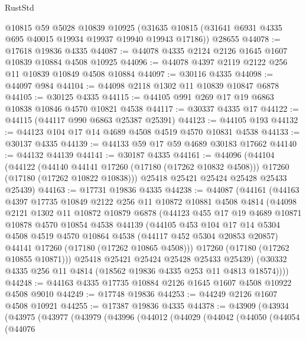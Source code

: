 \begin{lexlean}{RustStd}
\begin{coremodule}
    @10815
    @59
    @5028
    @10839
    @10925
    (@31635 @10815 (@31641 @6931 @4335 @695 @40015 @19934 @19937 @19940 @19943 @17186))
    @28655
@44078 := @17618 @19836 @4335
@44087 := @44078 @4335 @2124 @2126 @1645 @1607 @10839 @10884 @4508 @10925
@44096 := @44078 @4397 @2119 @2122 @256 @11 @10839 @10849 @4508 @10884
@44097 := @30116 @4335
@44098 := @44097 @984
@44104 := @44098 @2118 @1302 @11 @10839 @10847 @6878
@44105 := @30125 @4335
@44115 := @44105 @991 @269 @17 @19 @6863 @10838 @10846 @4570 @10821 @4538
@44117 := @30337 @4335 @17
@44122 := @44115 (@44117 @990 @6863 @25387 @25391)
@44123 := @44105 @193
@44132 := @44123 @104 @17 @14 @4689 @4508 @4519 @4570 @10831 @4538
@44133 := @30137 @4335
@44139 := @44133 @59 @17 @59 @4689 @30183 @17662
@44140 := @44132 @44139
@44141 := @30187 @4335
@44161 := @44096
    (@44104
      (@44122
        (@44140 @44141 @17260 (@17180 (@17262 @10832 @4508)))
        @17260
        (@17180 (@17262 @10822 @10838)))
      @25418
      @25421
      @25424
      @25428
      @25433
      @25439)
@44163 := @17731 @19836 @4335
@44238 := @44087
    (@44161
      (@44163
        @4397
        @17735
        @10849
        @2122
        @256
        @11
        @10872
        @10881
        @4508
        @4814
        (@44098
          @2121
          @1302
          @11
          @10872
          @10879
          @6878
          (@44123
            @455
            @17
            @19
            @4689
            @10871
            @10878
            @4570
            @10854
            @4538
            @44139
            (@44105
              @453
              @104
              @17
              @14
              @5304
              @4508
              @4519
              @4570
              @10864
              @4538
              (@44117 @452 @5304 @20853 @20857)
              @44141
              @17260
              (@17180 (@17262 @10865 @4508)))
            @17260
            (@17180 (@17262 @10855 @10871)))
          @25418
          @25421
          @25424
          @25428
          @25433
          @25439)
        (@30332 @4335 @256 @11 @4814 (@18562 @19836 @4335 @253 @11 @4813 @18574))))
@44248 := @44163 @4335 @17735 @10884 @2126 @1645 @1607 @4508 @10922 @4508 @9010
@44249 := @17748 @19836
@44253 := @44249 @2126 @1607 @4508 @10921
@44255 := @17387 @19836 @4335
@44378 := @43909
    (@43934
      (@43975
        (@43977
          (@43979
            (@43996
              (@44012
                (@44029
                  (@44042
                    (@44050
                      (@44054
                        (@44076

\end{coremodule}
\end{lexlean}
